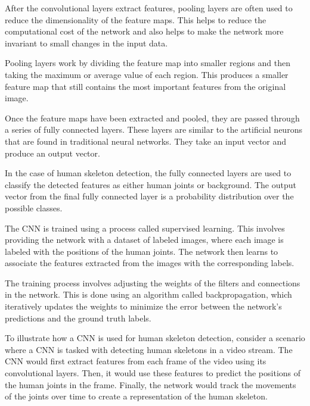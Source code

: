 After the convolutional layers extract features, pooling layers are often used to reduce the dimensionality of the feature maps. This helps to reduce the computational cost of the network and also helps to make the network more invariant to small changes in the input data.

Pooling layers work by dividing the feature map into smaller regions and then taking the maximum or average value of each region. This produces a smaller feature map that still contains the most important features from the original image.


Once the feature maps have been extracted and pooled, they are passed through a series of fully connected layers. These layers are similar to the artificial neurons that are found in traditional neural networks. They take an input vector and produce an output vector.

In the case of human skeleton detection, the fully connected layers are used to classify the detected features as either human joints or background. The output vector from the final fully connected layer is a probability distribution over the possible classes.


The CNN is trained using a process called supervised learning. This involves providing the network with a dataset of labeled images, where each image is labeled with the positions of the human joints. The network then learns to associate the features extracted from the images with the corresponding labels.

The training process involves adjusting the weights of the filters and connections in the network. This is done using an algorithm called backpropagation, which iteratively updates the weights to minimize the error between the network's predictions and the ground truth labels.


To illustrate how a CNN is used for human skeleton detection, consider a scenario where a CNN is tasked with detecting human skeletons in a video stream. The CNN would first extract features from each frame of the video using its convolutional layers. Then, it would use these features to predict the positions of the human joints in the frame. Finally, the network would track the movements of the joints over time to create a representation of the human skeleton.


